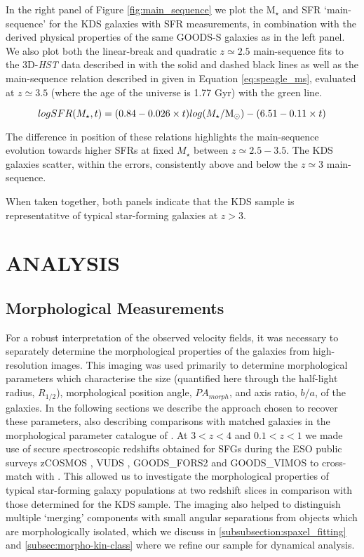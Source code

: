 \documentclass[fleqn,usenatbib]{mnras}
\begin{document}
In the right panel of Figure \ref{fig:main_sequence} we plot the M$_{\star}$ and SFR `main-sequence' for the KDS galaxies with SFR measurements, in combination with the derived physical properties of the same GOODS-S galaxies as in the left panel.
We also plot both the linear-break and quadratic $z\simeq2.5$ main-sequence fits to the 3D-{\em HST} data described in \cite{Whitaker2014} with the solid and dashed black lines as well as the main-sequence relation described in \cite{Speagle2014} given in Equation \ref{eq:speagle_ms}, evaluated at $z\simeq3.5$ (where the age of the universe is 1.77 Gyr) with the green line.

\begin{equation}\label{eq:speagle_ms}
logSFR(M_{\star}, t) = (0.84 - 0.026 \times t)log(M_{\star}/{\rm M}_{\odot}) - (6.51 - 0.11 \times t)
\end{equation}


The difference in position of these relations highlights the main-sequence evolution towards higher SFRs at fixed $M_{\star}$ between $z\simeq2.5-3.5$.
The KDS galaxies scatter, within the errors, consistently above and below the $z\simeq3$ main-sequence.

When taken together, both panels indicate that the KDS sample is representatitve of typical star-forming galaxies at $z>3$.

\section{ANALYSIS}\label{sec:analysis}


\subsection{Morphological Measurements}\label{subsec:morphological_measurements}
For a robust interpretation of the observed velocity fields, it was necessary to separately determine the morphological properties of the galaxies from high-resolution images.
This imaging was used primarily to determine morphological parameters which characterise the size (quantified here through the half-light radius, $R_{1/2}$), morphological position angle, $PA_{morph}$, and axis ratio, $b/a$, of the galaxies. 
In the following sections we describe the approach chosen to recover these parameters, also describing comparisons with matched galaxies in the morphological parameter catalogue of \cite{VanderWel2012}.
At $3 < z < 4$ and $0.1 < z < 1$ we made use of secure spectroscopic redshifts obtained for SFGs during the ESO public surveys zCOSMOS \citep{Lilly2007}, VUDS \citep{Tasca2016}, GOODS\_FORS2 \citep{Vanzella2005,Vanzella2006,Vanzella2008} and GOODS\_VIMOS \citep{Balestra2010} to cross-match with \cite{VanderWel2012}.
This allowed us to investigate the morphological properties of typical star-forming galaxy populations at two redshift slices in comparison with those determined for the KDS sample.
The imaging also helped to distinguish multiple `merging' components with small angular separations from objects which are morphologically isolated, which we discuss in \cref{subsubsection:spaxel_fitting} and \cref{subsec:morpho-kin-class} where we refine our sample for dynamical analysis.
\end{document}
